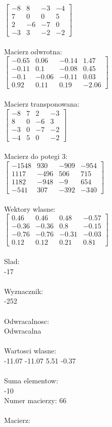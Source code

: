 \documentclass[a4paper,12pt]{article}
\begin{document}
$\begin{bmatrix} -8&8&-3&-4\\7&0&0&5\\2&-6&-7&0\\-3&3&-2&-2 \end{bmatrix}$
\\
\\
Macierz odwrotna:\\

$\begin{bmatrix} -0.65&0.06&-0.14&1.47\\-0.11&0.1&-0.08&0.45\\-0.1&-0.06&-0.11&0.03\\0.92&0.11&0.19&-2.06 \end{bmatrix}$
\\
\\
Macierz transponowana:\\

$\begin{bmatrix} -8&7&2&-3\\8&0&-6&3\\-3&0&-7&-2\\-4&5&0&-2 \end{bmatrix}$
\\
\\
Macierz do potegi 3:\\

$\begin{bmatrix} -1548&930&-909&-954\\1117&-496&506&715\\1182&-948&-9&654\\-541&307&-392&-340 \end{bmatrix}$
\\
\\
Wektory wlasne:\\

$\begin{bmatrix} 0.46&0.46&0.48&-0.57\\-0.36&-0.36&0.8&-0.15\\-0.76&-0.76&-0.31&-0.03\\0.12&0.12&0.21&0.81 \end{bmatrix}$
\\
\\
Slad:\\
-17
\\
\\
Wyznacznik:\\
-252
\\
\\
Odwracalnosc:\\
Odwracalna
\\
\\
Wartosci wlasne:\\
-11.07 -11.07 5.51 -0.37
\\
\\
Suma elementow:\\
-10
\\
\newpage
Numer macierzy:
66
\\
\\
Macierz:\\
\end{document}
